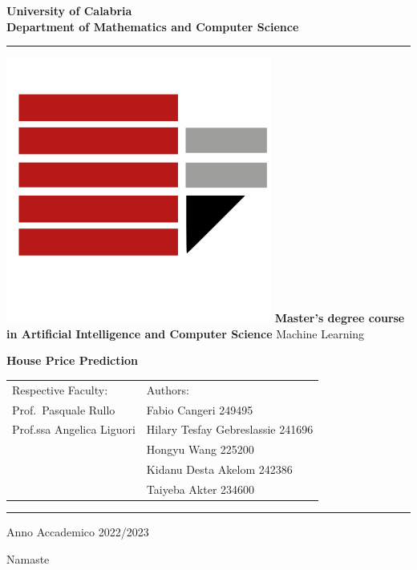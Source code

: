 \documentclass[a4paper,12pt]{report}
\newenvironment{dedication}
  {\clearpage           %
   \thispagestyle{empty}%
   \vspace*{\stretch{1}}%
   \itshape             %
   \raggedleft          %
  }
   {\par %
   \vspace{\stretch{3}} %
   \clearpage           %
  }
\begin{document}
\begin{titlepage}
\begin{center}
\textbf{\LARGE University of Calabria}\\
\textbf{Department of Mathematics and Computer Science}\\
\vskip 6pt
\hrule
\vskip 8pt
\includegraphics[width=0.13\linewidth]{logo.png}
\vskip 8pt
\textbf{Master’s degree course in Artificial Intelligence and Computer Science}
\vskip 32pt
Machine Learning

\vskip 70pt
{ \huge \bfseries 
    House Price Prediction  
}\\[0.4cm]
\vskip 150pt

\begin{tabular}{p{8cm}p{8cm}}
Respective Faculty: & Authors:\\
Prof.~Pasquale Rullo & Fabio Cangeri 249495 \\
Prof.ssa Angelica Liguori & Hilary Tesfay Gebreslassie 241696 \\
 & Hongyu Wang 225200 \\
 & Kidanu Desta Akelom 242386 \\
 & Taiyeba Akter 234600 \\
\end{tabular}


\vskip 60pt
\hrule
\vskip 6pt
Anno Accademico 2022/2023
\vfill
\end{center}

\end{titlepage}

\begin{dedication}
Namaste
\end{dedication}




\tableofcontents

%
%
%
%
\end{document}
